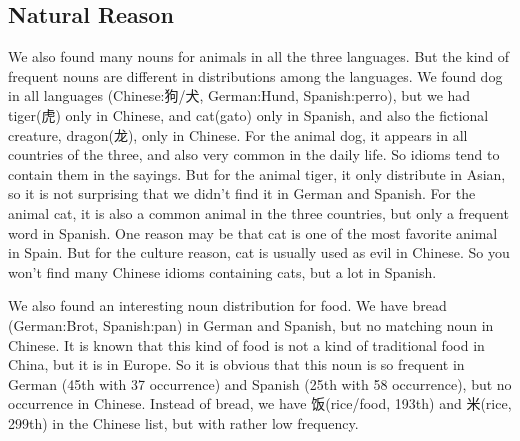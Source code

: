 \subsection{Natural Reason}
We also found many nouns for animals in all the three languages. But the kind of frequent nouns are different in distributions among the languages. We found dog in all languages (Chinese:狗/犬, German:Hund, Spanish:perro), but we had tiger(虎) only in Chinese, and cat(gato) only in Spanish, and also the fictional creature, dragon(龙), only in Chinese. 
For the animal dog, it appears in all countries of the three, and also very common in the daily life. So idioms tend to contain them in the sayings. But for the animal tiger, it only distribute in Asian, so it is not surprising that we didn't find it in German and Spanish. For the animal cat, it is also a common animal in the three countries, but only a frequent word in Spanish. One reason may be that cat is one of the most favorite animal in Spain. But for the culture reason, cat is usually used as evil in Chinese. So you won't find many Chinese idioms containing cats, but a lot in Spanish. 

We also found an interesting noun distribution for food. We have bread (German:Brot, Spanish:pan) in German and Spanish, but no matching noun in Chinese. It is known that this kind of food is not a kind of traditional food in China, but it is in Europe. So it is obvious that this noun is so frequent in German (45th with 37 occurrence) and Spanish (25th with 58 occurrence), but no occurrence in Chinese. Instead of bread, we have 饭(rice/food, 193th) and 米(rice, 299th) in the Chinese list, but with rather low frequency. 